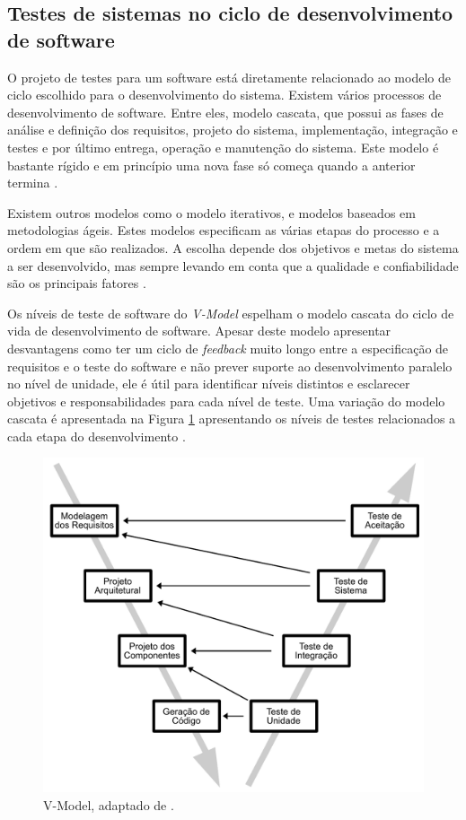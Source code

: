 \subsection{Testes de sistemas no ciclo de desenvolvimento de software}

O projeto de testes para um software está diretamente relacionado ao modelo de ciclo escolhido para o desenvolvimento do sistema. Existem vários processos de desenvolvimento de software. Entre eles, modelo cascata, que possui as fases de análise e definição dos requisitos, projeto do sistema, implementação, integração e testes e por último entrega, operação e manutenção do sistema. Este modelo é bastante rígido e em princípio uma nova fase só começa quando a anterior termina \cite{sommerville2010}.

Existem outros modelos como o modelo iterativos, e modelos baseados em metodologias ágeis. Estes modelos especificam as várias etapas do processo e a ordem em que são realizados. A escolha  depende dos objetivos e metas do sistema a ser desenvolvido, mas sempre levando em conta que a qualidade e confiabilidade são os principais fatores \cite{graham2008foundations}.

Os níveis de teste de software do \textit{V-Model} espelham o modelo cascata do ciclo de vida de desenvolvimento de software. Apesar deste modelo apresentar desvantagens como ter um ciclo de \textit{feedback} muito longo entre a especificação de requisitos e o teste do software e não prever suporte ao desenvolvimento paralelo no nível de unidade, ele é útil para identificar níveis distintos e esclarecer objetivos e responsabilidades para cada nível de teste. Uma variação do modelo cascata é apresentada na Figura \ref{fig:v-model} apresentando os níveis de testes relacionados a cada etapa do desenvolvimento \cite{jorgensen2016software}. 

\begin{figure}[ht]
\centering
\includegraphics[scale=0.6]{imagens/v-model.pdf}
\caption{V-Model, adaptado de \cite{pressman2005software}.}
\label{fig:v-model}
\end{figure}

